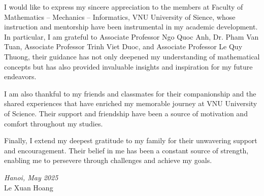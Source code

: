 \documentclass[12pt,a4paper]{report}
\theoremstyle{definition}
\theoremstyle{remark}
\theoremstyle{definition}
\begin{document}
I would like to express my sincere appreciation to the members at Faculty of Mathematics – Mechanics – Informatics, VNU University of Sience, whose instruction and mentorship have been instrumental in my academic development. In particular, I am grateful to Associate Professor Ngo Quoc Anh, Dr. Pham Van Tuan, Associate Professor Trinh Viet Duoc, and Associate Professor Le Quy Thuong, their guidance has not only deepened my understanding of mathematical concepts but has also provided invaluable insights and inspiration for my future endeavors.

I am also thankful to my friends and classmates for their companionship and the shared experiences that have enriched my memorable journey at VNU University of Science. Their support and friendship have been a source of motivation and comfort throughout my studies.

Finally, I extend my deepest gratitude to my family for their unwavering support and encouragement. Their belief in me has been a constant source of strength, enabling me to persevere through challenges and achieve my goals.
\begin{flushright}
    \textit{Hanoi, May 2025}\\
    Le Xuan Hoang
\end{flushright}
\printnomenclature
\end{document}
